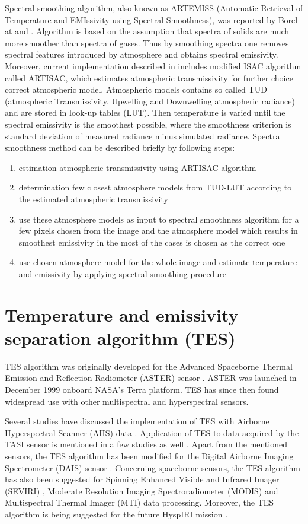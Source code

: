 Spectral smoothing algorithm, also known as ARTEMISS (Automatic Retrieval of Temperature and EMIssivity using Spectral Smoothness), was reported by Borel at \cite{B98} and \cite{B08}. Algorithm is based on the assumption that spectra of solids are much more smoother than spectra of gases. Thus by smoothing spectra one removes spectral features introduced by atmosphere and obtains spectral emissivity. Moreover, current implementation described in \cite{B08} includes modified ISAC algorithm called ARTISAC, which estimates atmospheric transmissivity for further choice correct atmospheric model. Atmospheric models contains so called TUD (atmospheric Transmissivity, Upwelling and Downwelling atmospheric radiance) and are stored in look-up tables (LUT). Then temperature is varied until the spectral emissivity is the smoothest possible, where the smoothness criterion is standard deviation of measured radiance minus simulated radiance. Spectral smoothness method can be described briefly by following steps:
\begin{enumerate}
	\item estimation atmospheric transmissivity using ARTISAC algorithm
	\item determination few closest atmosphere models from TUD-LUT according to the estimated atmospheric transmissivity
	\item use these atmosphere models as input to spectral smoothness algorithm for a few pixels chosen from the image and the atmosphere model which results in smoothest emissivity in the most of the cases is chosen as the correct one
	\item use chosen atmosphere model for the whole image and estimate temperature and emissivity by applying spectral smoothing procedure
\end{enumerate}

\section{Temperature and emissivity separation algorithm (TES)}

TES algorithm was originally developed for the Advanced Spaceborne Thermal Emission and Reflection Radiometer (ASTER) sensor \cite{GR98}. ASTER was launched in December 1999 onboard NASA's Terra platform. TES has since then found widespread use with other multispectral and hyperspectral sensors.

Several studies have discussed the implementation of TES with Airborne Hyperspectral Scanner (AHS) data \cite{SJ06, JS12}. Application of TES to data acquired by the TASI sensor is mentioned in a few studies as well \cite{WX11, PP12}. Apart from the mentioned sensors, the TES algorithm has been modified for the Digital Airborne Imaging Spectrometer (DAIS) sensor \cite{SJ02}. Concerning spaceborne sensors, the TES algorithm has also been suggested for Spinning Enhanced Visible and Infrared Imager (SEVIRI) \cite{JS14}, Moderate Resolution Imaging Spectroradiometer (MODIS) \cite{HH11} and Multispectral Thermal Imager (MTI) \cite{MB02} data processing. Moreover, the TES algorithm is being suggested for the future HyspIRI mission \cite{HH11-2}.

